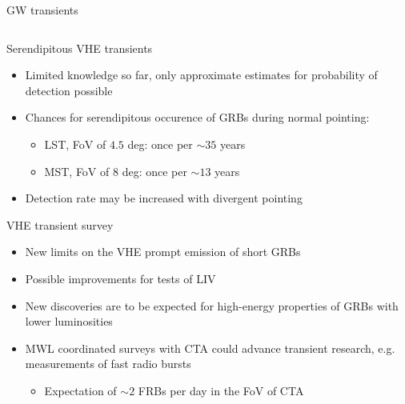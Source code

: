 \begin{frame}{GW transients}
\begin{columns}[T]
{\begin{column}{0.38\textwidth}
    \end{column}%
    }
  \end{columns}
\end{frame}

\begin{frame}{Serendipitous VHE transients}
  \begin{itemize}
    \item Limited knowledge so far, only approximate estimates for probability of detection possible
    \item Chances for serendipitous occurence of GRBs during normal pointing:
    \begin{itemize}
      \item [\to] LST, FoV of $\num{4.5}$ deg: once per $\sim\num{35}$ years
      \item [\to] MST, FoV of $\num{8}$ deg: once per $\sim\num{13}$ years
    \end{itemize}
    \item Detection rate may be increased with divergent pointing
  \end{itemize}
\end{frame}

\begin{frame}{VHE transient survey}
  \begin{itemize}
    \item New limits on the VHE prompt emission of short GRBs
    \item Possible improvements for tests of LIV
    \item New discoveries are to be expected for high-energy properties of GRBs with lower luminosities
    \item MWL coordinated surveys with CTA could advance transient research, e.g. measurements of fast radio bursts
    \begin{itemize}
      \item [\to] Expectation of $\sim\num{2}$ FRBs per day in the FoV of CTA
    \end{itemize}
  \end{itemize}
\end{frame}
